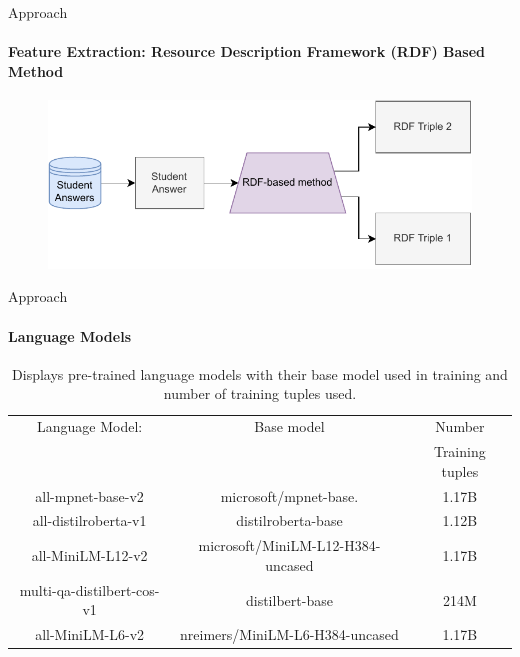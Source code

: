 \documentclass[aspectratio=169]{beamer}
\begin{document}
\begin{frame}{Approach}
\framesubtitle{Feature Extraction: Resource Description Framework (RDF) Based Method}
\begin{figure}
	\centering
	\includegraphics[scale = 1]{images/RDF_FE_slides.pdf}
	\label{fig:rdf fe}
\end{figure}
\end{frame}
\begin{frame}{Approach}
\framesubtitle{Language Models}
\begin{table}
	\begin{center}
		\begin{tabular}{ |c|c|c| }
			\hline
			Language Model: & Base model & Number \\&&Training tuples  
			\\ \hline 
			all-mpnet-base-v2\cite{SBERT} & 	microsoft/mpnet-base. &1.17B
			
			\\ \hline
			all-distilroberta-v1\cite{SBERT} & 	distilroberta-base &1.12B
			\\ \hline
			all-MiniLM-L12-v2\cite{SBERT} & 		microsoft/MiniLM-L12-H384-uncased &1.17B
			\\ \hline
			multi-qa-distilbert-cos-v1\cite{SBERT} & 	distilbert-base &214M
			\\ \hline
			all-MiniLM-L6-v2\cite{SBERT} & 		nreimers/MiniLM-L6-H384-uncased &1.17B
			\\ \hline
		\end{tabular}
		\caption{Displays pre-trained language models with their base model used in training and number of training tuples used\cite{SBERT}.}
		\label{table:language models}
	\end{center}
\end{table}
\end{frame}
\end{document}
